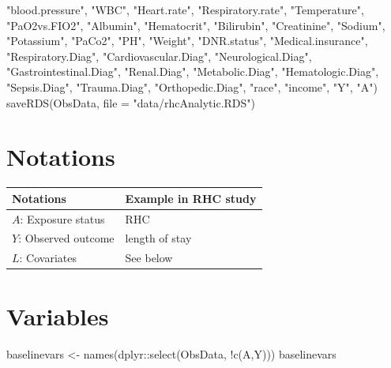 \documentclass[
]{book}
\newenvironment{Shaded}{\begin{snugshade}}{\end{snugshade}}
\newcommand{\AttributeTok}[1]{\textcolor[rgb]{0.77,0.63,0.00}{#1}}
\newcommand{\FunctionTok}[1]{\textcolor[rgb]{0.00,0.00,0.00}{#1}}
\newcommand{\NormalTok}[1]{#1}
\newcommand{\OtherTok}[1]{\textcolor[rgb]{0.56,0.35,0.01}{#1}}
\newcommand{\SpecialCharTok}[1]{\textcolor[rgb]{0.00,0.00,0.00}{#1}}
\newcommand{\StringTok}[1]{\textcolor[rgb]{0.31,0.60,0.02}{#1}}
\begin{document}
\begin{Shaded}
\begin{Highlighting}[]
                    \StringTok{"blood.pressure"}\NormalTok{, }\StringTok{"WBC"}\NormalTok{, }\StringTok{"Heart.rate"}\NormalTok{, }\StringTok{"Respiratory.rate"}\NormalTok{, }
                    \StringTok{"Temperature"}\NormalTok{, }\StringTok{"PaO2vs.FIO2"}\NormalTok{, }\StringTok{"Albumin"}\NormalTok{, }\StringTok{"Hematocrit"}\NormalTok{, }
                    \StringTok{"Bilirubin"}\NormalTok{, }\StringTok{"Creatinine"}\NormalTok{, }\StringTok{"Sodium"}\NormalTok{, }\StringTok{"Potassium"}\NormalTok{, }\StringTok{"PaCo2"}\NormalTok{, }
                    \StringTok{"PH"}\NormalTok{, }\StringTok{"Weight"}\NormalTok{, }\StringTok{"DNR.status"}\NormalTok{, }\StringTok{"Medical.insurance"}\NormalTok{, }
                    \StringTok{"Respiratory.Diag"}\NormalTok{, }\StringTok{"Cardiovascular.Diag"}\NormalTok{, }
                    \StringTok{"Neurological.Diag"}\NormalTok{, }\StringTok{"Gastrointestinal.Diag"}\NormalTok{, }\StringTok{"Renal.Diag"}\NormalTok{,}
                    \StringTok{"Metabolic.Diag"}\NormalTok{, }\StringTok{"Hematologic.Diag"}\NormalTok{, }\StringTok{"Sepsis.Diag"}\NormalTok{, }
                    \StringTok{"Trauma.Diag"}\NormalTok{, }\StringTok{"Orthopedic.Diag"}\NormalTok{, }\StringTok{"race"}\NormalTok{, }\StringTok{"income"}\NormalTok{, }
                    \StringTok{"Y"}\NormalTok{, }\StringTok{"A"}\NormalTok{)}
\FunctionTok{saveRDS}\NormalTok{(ObsData, }\AttributeTok{file =} \StringTok{"data/rhcAnalytic.RDS"}\NormalTok{)}
\end{Highlighting}
\end{Shaded}

\hypertarget{notations}{%
\section{Notations}\label{notations}}

\begin{longtable}[]{@{}ll@{}}
\toprule
Notations & Example in RHC study\tabularnewline
\midrule
\endhead
\(A\): Exposure status & RHC\tabularnewline
\(Y\): Observed outcome & length of stay\tabularnewline
\(L\): Covariates & See below\tabularnewline
\bottomrule
\end{longtable}

\hypertarget{variables}{%
\section{Variables}\label{variables}}

\begin{Shaded}
\begin{Highlighting}[]
\NormalTok{baselinevars }\OtherTok{\textless{}{-}} \FunctionTok{names}\NormalTok{(dplyr}\SpecialCharTok{::}\FunctionTok{select}\NormalTok{(ObsData, }
                         \SpecialCharTok{!}\FunctionTok{c}\NormalTok{(A,Y)))}
\NormalTok{baselinevars}
\end{Highlighting}
\end{Shaded}
\end{document}

